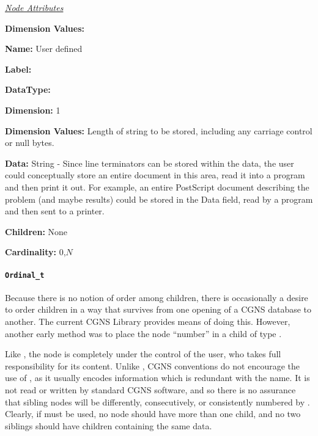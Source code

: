 \textit{\uline{Node Attributes}}
\begin{Ventryic}{\textbf{Dimension Values:}}
\item [\textbf{Name:}]
      User defined
\item [\textbf{Label:}]
\item [\textbf{DataType:}]
\item [\textbf{Dimension:}]
      1
\item [\textbf{Dimension Values:}]
      Length of string to be stored, including any carriage control or
      null bytes.
\item [\textbf{Data:}]
      String - Since line terminators can be stored within the data,
      the user could conceptually store an entire document in this
      area, read it into a program and then print it out. For example,
      an entire PostScript document describing the problem (and maybe
      results) could be stored in the Data field, read by a program and
      then sent to a printer.
\item [\textbf{Children:}]
      None
\item [\textbf{Cardinality:}]
      0,$N$
\end{Ventryic}

\paragraph{\texttt{Ordinal\_t}}

Because there is no notion of order among children, there is
occasionally a desire to order children in a way that survives from one
opening of a CGNS database to another. The current CGNS Library provides
means of doing this. However, another early method was to place the node
``number'' in a child of type .

Like , the  node is completely
under the control of the user, who takes full responsibility for its
content. Unlike , CGNS conventions do not encourage
the use of , as it usually encodes information which
is redundant with the name. It is not read or written by standard
CGNS software, and so there is no assurance that sibling nodes
will be differently, consecutively, or consistently numbered by
. Clearly, if  must be used, no node
should have more than one  child, and no two siblings
should have  children containing the same data.

